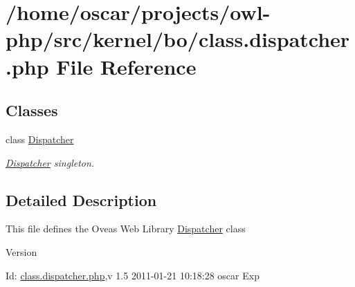 \section{/home/oscar/projects/owl-\/php/src/kernel/bo/class.dispatcher.php File Reference}
\label{class_8dispatcher_8php}
\subsection*{Classes}
\begin{DoxyCompactItemize}
\item 
class \hyperlink{classDispatcher}{Dispatcher}
\begin{DoxyCompactList}\small\item\em \hyperlink{classDispatcher}{Dispatcher} singleton. \item\end{DoxyCompactList}\end{DoxyCompactItemize}


\subsection{Detailed Description}
This file defines the Oveas Web Library \hyperlink{classDispatcher}{Dispatcher} class \begin{DoxyVersion}{Version}

\end{DoxyVersion}
\begin{DoxyParagraph}{Id:}
\hyperlink{class_8dispatcher_8php}{class.dispatcher.php},v 1.5 2011-\/01-\/21 10:18:28 oscar Exp 
\end{DoxyParagraph}
